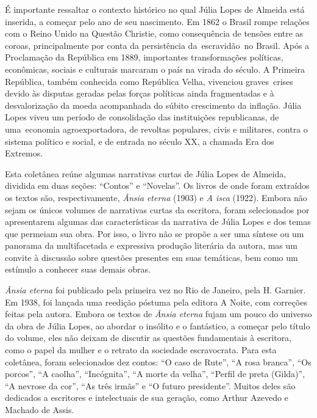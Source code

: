 \documentclass[12pt]{extarticle}
\begin{document}
É importante ressaltar o contexto histórico no qual Júlia Lopes de
Almeida está inserida, a começar pelo ano de seu nascimento. Em 1862 o
Brasil rompe relações com o Reino Unido na Questão Christie, como
consequência de tensões entre as coroas, principalmente por conta da
persistência da~escravidão~no Brasil. Após a Proclamação da República em
1889, importantes transformações políticas, econômicas, sociais e
culturais marcaram o país na virada do século. A Primeira República,
também conhecida como República Velha, vivenciou graves~crises devido às
disputas geradas pelas forças políticas ainda fragmentadas e à
desvalorização da moeda acompanhada do súbito crescimento da inflação.
Júlia Lopes viveu um período de consolidação das instituições
republicanas, de uma~economia agroexportadora, de revoltas populares,
civis e militares, contra o sistema político e social, e de entrada no
século XX, a chamada Era dos Extremos.

Esta coletânea reúne algumas narrativas curtas de Júlia Lopes de
Almeida, dividida em duas seções: ``Contos'' e ``Novelas''. Os livros de
onde foram extraídos os textos são, respectivamente, \emph{Ânsia eterna}
(1903) e \emph{A isca} (1922). Embora não sejam os únicos volumes de
narrativas curtas da escritora, foram selecionados por apresentarem
algumas das características da narrativa de Júlia Lopes e dos temas que
permeiam sua obra. Por isso, o livro não se propõe a ser uma síntese ou
um panorama da multifacetada e expressiva produção literária da autora,
mas um convite à discussão sobre questões presentes em suas temáticas,
bem como um estímulo a conhecer suas demais obras.

\emph{Ânsia eterna} foi publicado pela primeira vez no Rio de Janeiro,
pela H. Garnier. Em 1938, foi lançada uma reedição póstuma pela editora
A Noite, com correções feitas pela autora. Embora os textos de
\emph{Ânsia eterna} fujam um pouco do universo da obra de Júlia Lopes,
ao abordar o insólito e o fantástico, a começar pelo título do volume,
eles não deixam de discutir as questões fundamentais à escritora, como o
papel da mulher e o retrato da sociedade escravocrata. Para esta
coletânea, foram selecionados dez contos: ``O caso de Rute'', ``A rosa
branca'', ``Os porcos'', ``A caolha'', ``Incógnita'', ``A morte da
velha'', ``Perfil de preta (Gilda)'', ``A nevrose da cor'', ``As três
irmãs'' e ``O futuro presidente''. Muitos deles são dedicados a
escritores e intelectuais de sua geração, como Arthur Azevedo e Machado
de Assis.
\end{document}
